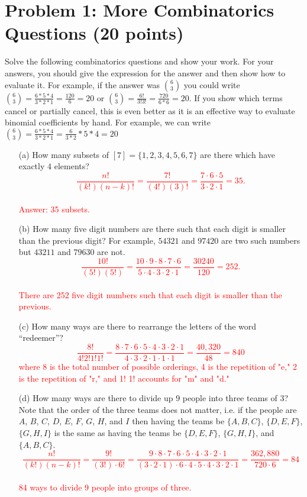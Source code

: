 \documentclass[12pt]{article}
\begin{document}
\section*{Problem 1: More Combinatorics Questions (20 points)}
Solve the following combinatorics questions and show your work. For your answers, you should give the expression for the answer and then show how to evaluate it. For example, if the answer was $\binom{6}{3}$ you could write $\binom{6}{3} = \frac{6*5*4}{3*2*1} = \frac{120}{6} = 20$ or $\binom{6}{3} = \frac{6!}{3!3!} = \frac{720}{6*6} = 20$. If you show which terms cancel or partially cancel, this is even better as it is an effective way to evaluate binomial coefficients by hand. For example, we can write $\binom{6}{3} = \frac{6*5*4}{3*2*1} = \frac{6}{3*2}*5*4 = 20$
\begin{enumerate}
\item[(a)] How many subsets of $[7] = \{1,2,3,4,5,6,7\}$ are there which have exactly $4$ elements?
\\ \textcolor{red}{$$\frac{n!}{(k!)(n-k)!} = \frac{7!}{(4!)(3)!} = \frac{7 \cdot 6 \cdot 5}{3 \cdot 2 \cdot 1} = 35. $$ \\ Answer: 35 subsets.}

\item[(b)] How many five digit numbers are there such that each digit is smaller than the previous digit? For example, $54321$ and $97420$ are two such numbers but $43211$ and $79630$ are not.
\\ \textcolor{red}{$$\frac{10!}{(5!)(5!)} = \frac{10 \cdot 9 \cdot 8 \cdot 7 \cdot 6}{5 \cdot 4 \cdot 3 \cdot 2 \cdot 1} = \frac{30240}{120} = 252.$$ \\ There are 252 five digit numbers such that each digit is smaller than the previous.}

\item[(c)] How many ways are there to rearrange the letters of the word ``redeemer''?
\\ \textcolor{red}{$$\frac{8!}{4!2!1!1!} = \frac{8 \cdot 7 \cdot 6 \cdot 5 \cdot 4 \cdot 3 \cdot 2 \cdot 1}{4 \cdot 3 \cdot 2 \cdot 1 \cdot 1 \cdot 1} = \frac{40,320}{48} = 840$$ where 8 is the total number of possible orderings, 4 is the repetition of "e," 2 is the repetition of "r," and 1! 1! accounts for "m" and "d."}
\item[(d)] How many ways are there to divide up $9$ people into three teams of $3$? Note that the order of the three teams does not matter, i.e. if the people are $A$, $B$, $C$, $D$, $E$, $F$, $G$, $H$, and $I$ then having the teams be $\{A,B,C\}$, $\{D,E,F\}$, $\{G,H,I\}$ is the same as having the teams be $\{D,E,F\}$, $\{G,H,I\}$, and $\{A,B,C\}$.
\\ \textcolor{red}{$$\frac{n!}{(k!)(n-k)!} = \frac{9!}{(3!) \cdot 6!} = \frac{9 \cdot 8 \cdot 7 \cdot 6 \cdot 5 \cdot 4 \cdot 3 \cdot 2 \cdot 1}{(3 \cdot 2 \cdot 1) \cdot 6 \cdot 4 \cdot 5 \cdot 4 \cdot 3 \cdot 2 \cdot 1} = \frac{362,880}{720 \cdot 6} = 84$$ \\ 84 ways to divide 9 people into groups of three.}
\end{enumerate}
\end{document}
